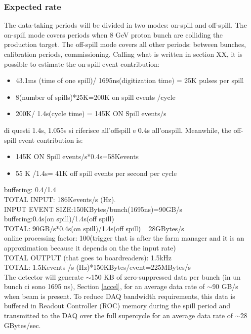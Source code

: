 \subsubsection{Expected rate}
The data-taking periods will be divided in two modes: on-spill and off-spill. The on-spill mode covers periods when 8 GeV proton bunch are colliding the production target. The off-spill mode covers all other periods: between bunches, calibration periods, commissioning. 
Calling what is written in section XX, it is possible to estimate the on-spill event contribution:
\begin{itemize}
    \item 43.1ms (time of one spill)/ 1695ns(digitization time) = 25K pulses per spill
    \item 8(number of spills)*25K=200K on spill events /cycle
    \item 200K/ 1.4s(cycle time) = 145K ON Spill events/s
\end{itemize}
di questi 1.4s, 1.055s si riferisce all'offspill e 0.4s all'onspill.
Meanwhile, the off-spill event contribution is:
\begin{itemize}
    \item 145K ON Spill events/s*0.4s=58Kevents
    \item 55 K /1.4s= 41K off spill events per second per cycle
\end{itemize}
buffering: 0.4/1.4
\\
TOTAL INPUT: 186Kevents/s (Hz).
\\
INPUT EVENT SIZE:150KBytes/bunch(1695ns)=90GB/s
\\
buffering:0.4s(on spill)/1.4s(off spill)
\\
TOTAL: 90GB/s*0.4s(on spill)/1.4s(off spill)= 28GBytes/s
\\
online processing factor: 100(trigger that is after the farm manager and it is an approximation because it depends on the the input rate)
\\
TOTAL OUTPUT (that goes to boardreaders): 1.5kHz
\\
TOTAL: 1.5Kevents /s (Hz)*150KBytes/event=225MBytes/s
\\
The detector will generate $\sim$150 KB of zero-suppressed data per bunch (in un bunch ci sono 1695 ns), Section \ref{accel}, for an average data rate of $\sim$90 GB/s when beam is present. To reduce DAQ bandwidth requirements, this data is buffered in Readout
Controller (ROC) memory during the spill period and transmitted to the DAQ over the full supercycle for an average data rate of $\sim$28 GBytes/sec.

